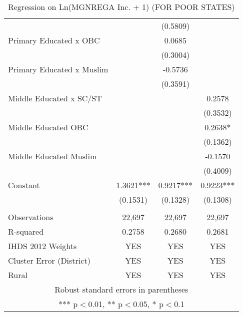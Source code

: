 \documentclass{article}
\begin{document}
\begin{landscape}
\begin{table}[]
\begin{tabular}{lccc}
 &  & (0.5809) &  \\
Primary Educated x OBC &  & 0.0685 &  \\
 &  & (0.3004) &  \\
Primary Educated x Muslim &  & -0.5736 &  \\
 &  & (0.3591) &  \\
Middle Educated x SC/ST &  &  & 0.2578 \\
 &  &  & (0.3532) \\
Middle Educated OBC &  &  & 0.2638* \\
 &  &  & (0.1362) \\
Middle Educated Muslim &  &  & -0.1570 \\
 &  &  & (0.4009) \\
Constant & 1.3621*** & 0.9217*** & 0.9223*** \\
 & (0.1531) & (0.1328) & (0.1308) \\\hline
 &  &  &  \\
Observations & 22,697 & 22,697 & 22,697 \\
 R-squared & 0.2758 & 0.2680 & 0.2681 \\ 
 IHDS 2012 Weights & YES & YES & YES \\
Cluster Error (District) & YES & YES & YES \\
Rural & YES & YES & YES \\\hline
\multicolumn{4}{c}{ Robust standard errors in parentheses} \\
\multicolumn{4}{c}{ *** p$<$0.01, ** p$<$0.05, * p$<$0.1} \\ \hline
\end{tabular}
    \caption{Regression on Ln(MGNREGA Inc. + 1) (FOR POOR STATES)}
    \label{tab7}
\end{table}
\end{landscape}
\newpage
\end{document}
